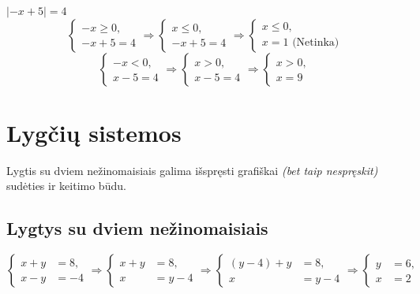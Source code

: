 \documentclass[fleqn]{article} %
\begin{document}
$|-x + 5| = 4$
\begin{equation*}
    \begin{cases}
        -x \ge 0, \\
        -x + 5 = 4
    \end{cases}
    \Rightarrow
    \begin{cases}
        x \le 0, \\
        -x + 5 = 4
    \end{cases}
    \Rightarrow
    \begin{cases}
        x \le 0, \\
        x = 1\text{ (Netinka)}
    \end{cases}
\end{equation*}
\begin{equation*}
    \begin{cases}
        -x < 0, \\
        x - 5 = 4
    \end{cases}
    \Rightarrow
    \begin{cases}
        x > 0, \\
        x - 5 = 4
    \end{cases}
    \Rightarrow
    \begin{cases}
        x > 0, \\
        x = 9
    \end{cases}
\end{equation*}


\section{Lygčių sistemos}

Lygtis su dviem nežinomaisiais galima išspręsti grafiškai \textit{(bet taip nespręskit)} sudėties ir keitimo būdu.

\subsection{Lygtys su dviem nežinomaisiais}
\begin{equation}
    \begin{cases}
        x + y &= 8, \\
        x - y &= -4
    \end{cases}
    \Rightarrow
    \begin{cases}
        x + y &= 8, \\
        x     &= y - 4
    \end{cases}
    \Rightarrow
    \begin{cases}
        (y - 4) + y &= 8, \\
        x           &= y - 4
    \end{cases}
    \Rightarrow
    \begin{cases}
        y &= 6, \\
        x &= 2
    \end{cases}
\end{equation}
\end{document}

